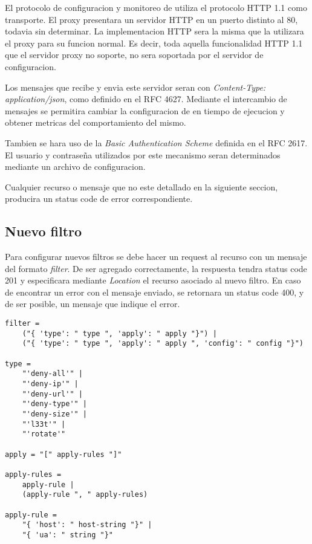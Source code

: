 \documentclass[11pt,a4paper,titlepage]{article}
\begin{document}
El protocolo de configuracion y monitoreo de \duta utiliza el protocolo HTTP 1.1 como transporte.
El proxy presentara un servidor HTTP en un puerto distinto al 80, todavia sin determinar.
La implementacion HTTP sera la misma que la utilizara el proxy para su funcion normal.
Es decir, toda aquella funcionalidad HTTP 1.1 que el servidor proxy no soporte, no sera soportada por el servidor de configuracion.

Los mensajes que recibe y envia este servidor seran con \textit{Content-Type: application/json}, como definido en el RFC 4627.
Mediante el intercambio de mensajes se permitira cambiar la configuracion de \duta en tiempo de ejecucion y obtener metricas del comportamiento del mismo.

Tambien se hara uso de la \textit{Basic Authentication Scheme} definida en el RFC 2617.
El usuario y contraseña utilizados por este mecanismo seran determinados mediante un archivo de configuracion.

Cualquier recurso o mensaje que no este detallado en la siguiente seccion, producira un status code de error correspondiente.

\subsection{Nuevo filtro}
\label{sec:new-filter}
Para configurar nuevos filtros se debe hacer un request  al recurso  con un mensaje del formato \textit{filter}.
De ser agregado correctamente, la respuesta tendra status code 201 y especificara mediante \textit{Location} el recurso asociado al nuevo filtro.
En caso de encontrar un error con el mensaje enviado, se retornara un status code 400, y de ser posible, un mensaje que indique el error.

\begin{verbatim}
filter =
    ("{ 'type': " type ", 'apply': " apply "}") |
    ("{ 'type': " type ", 'apply': " apply ", 'config': " config "}")

type =
    "'deny-all'" |
    "'deny-ip'" |
    "'deny-url'" |
    "'deny-type'" |
    "'deny-size'" |
    "'l33t'" |
    "'rotate'"

apply = "[" apply-rules "]"

apply-rules =
    apply-rule |
    (apply-rule ", " apply-rules)

apply-rule =
    "{ 'host': " host-string "}" |
    "{ 'ua': " string "}"

\end{verbatim}
\end{document}
